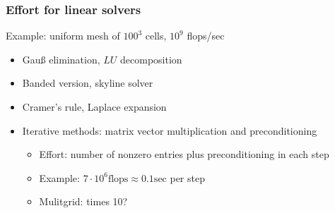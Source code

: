 \begin{frame}
  \frametitle{Effort for linear solvers}
  Example: uniform mesh of $100^3$ cells, $10^9$ flops/sec
  \begin{itemize}
  \item<+-> Gauß elimination, $LU$ decomposition
  \item<+-> Banded version, skyline solver
  \item<+-> Cramer's rule, Laplace expansion
  \item<+-> Iterative methods: matrix vector multiplication and
    preconditioning
    \begin{itemize}
    \item Effort: number of nonzero entries plus preconditioning
      in each step
    \item Example: $7\cdot 10^6\text{flops} \approx 0.1
      \text{sec}$ per step
    \item Mulitgrid: times 10?
    \end{itemize}
  \end{itemize}
\end{frame}

